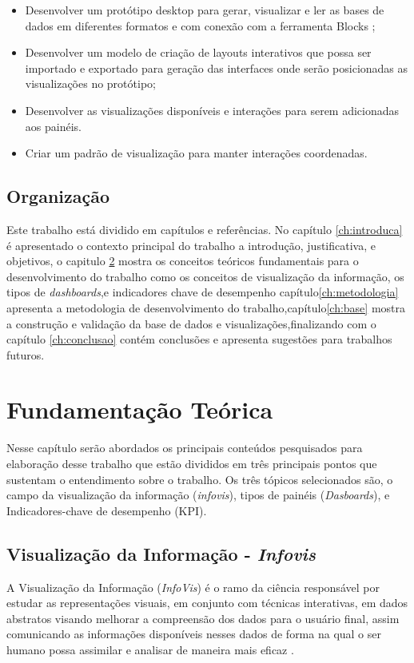 \documentclass[
	12pt,				%
	openright,			%
	oneside,			%
	a4paper,			%
	english,			%
	brazil				%
	]{abntex2}
\begin{document}
\begin{itemize}
    \item  Desenvolver um protótipo desktop para gerar, visualizar e ler as bases de dados em diferentes formatos e com conexão com a ferramenta Blocks  \cite{blocks};
    \item Desenvolver um modelo de criação de layouts interativos que possa ser importado e exportado para geração das interfaces onde serão posicionadas as visualizações no protótipo;
    \item Desenvolver as visualizações disponíveis e interações para serem adicionadas aos painéis.
    \item Criar um padrão de visualização para manter interações coordenadas.
\end{itemize}

\section{Organização}
\label{ch:organizacao}

Este trabalho está dividido em capítulos e referências. No capítulo \ref{ch:introduca} é apresentado o contexto principal do trabalho a introdução, justificativa, e objetivos, o capitulo \ref{ch:fundamentacao} mostra os conceitos teóricos fundamentais para o desenvolvimento do trabalho como os conceitos de visualização da informação, os tipos de \textit{dashboards},e indicadores chave de desempenho  
capítulo\ref{ch:metodologia} apresenta a metodologia de desenvolvimento do trabalho,capítulo\ref{ch:base} mostra a construção e validação da base de dados e visualizações,finalizando com o capítulo \ref{ch:conclusao} contém conclusões e apresenta sugestões para trabalhos futuros.



\chapter{Fundamentação Teórica}
\label{ch:fundamentacao}


Nesse capítulo serão abordados os principais conteúdos pesquisados para elaboração desse trabalho que estão divididos em três principais pontos que sustentam o entendimento sobre o trabalho. Os três tópicos selecionados são, o campo da visualização da informação (\textit{infovis}), tipos de painéis (\textit{Dasboards}), e Indicadores-chave de desempenho (KPI).

\section{Visualização da Informação - \textit{Infovis}}
A Visualização da Informação (\textit{InfoVis}) é o ramo da ciência responsável por estudar as representações visuais, em conjunto com técnicas interativas, em dados abstratos visando melhorar a compreensão dos dados para o usuário final, assim comunicando as informações disponíveis nesses dados de forma na qual o ser humano possa assimilar e analisar de maneira mais eficaz \cite{few2009now}.
\end{document}
